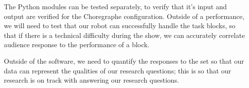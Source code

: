 \documentclass[onecolumn, draftclsnofoot,10pt, compsoc]{IEEEtran}
\begin{document}
	The Python modules can be tested separately, to verify that it’s input and output are verified for the Choregraphe configuration. Outside of a performance, we will need to test that our robot can successfully handle the task blocks, so that if there is a technical difficulty during the show, we can accurately correlate audience response to the performance of a block.

	Outside of the software, we need to quantify the responses to the set so that our data can represent the qualities of our research questions; this is so that our research is on track with answering our research questions.




% 
% 
\end{document}
